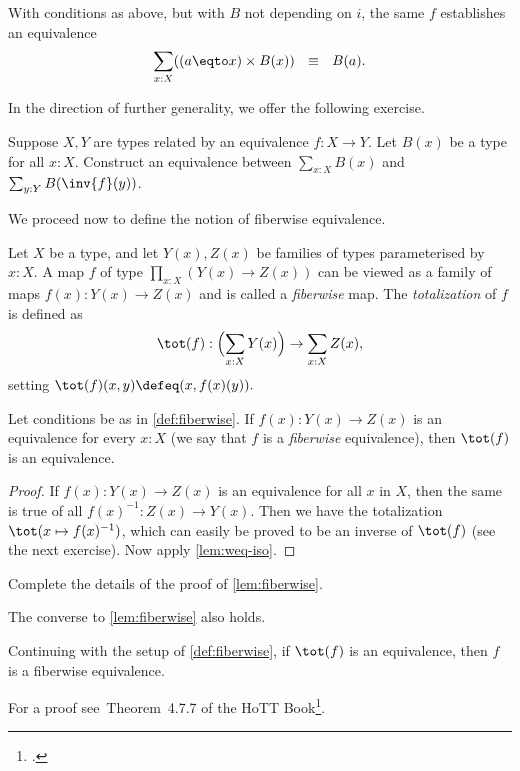 \begin{corollary}\label{cor:contract-away}
With conditions as above, but with $B$ not depending on $i$, the same $f$
establishes an equivalence
\[
 \sum_{x:X} ((a \eqto x)\times B(x))~~\equiv~~B(a).
\]
\end{corollary}

In the direction of further generality, we offer the following exercise.
\begin{xca}\label{xca:sum-equiv-base}
  Suppose $X,Y$ are types related by an equivalence $f : X \to Y$.
  Let $B(x)$ be a type for all $x:X$. Construct an equivalence between
  $\sum_{x:X}B(x)$ and $\sum_{y:Y}B(\inv{f}(y))$.
\end{xca}
We proceed now to define the notion of fiberwise equivalence.

\begin{definition}\label{def:fiberwise}
Let $X$ be a type, and let $Y(x),Z(x)$ be families of types parameterised
by $x:X$. A map $f$ of type $\prod_{x:X}(Y(x)\to Z(x))$
can be viewed as a family of maps $f(x): Y(x)\to Z(x)$ and is called a
\emph{fiberwise} map. The \emph{totalization} of $f$ is defined as
\[
  \tot(f) : \Bigl(\sum_{x:X} Y(x)\Bigr) \to \sum_{x:X} Z(x),
\]
setting $\tot(f)(x,y)\defeq (x,f(x)(y)).$
\end{definition}

\begin{lemma}\label{lem:fiberwise}
Let conditions be as in \cref{def:fiberwise}.
If $f(x): Y(x) \to Z(x)$ is an equivalence for every $x:X$
(we say that $f$ is a \emph{fiberwise} equivalence),
then $\tot(f)$ is an equivalence.
\end{lemma}
\begin{proof}
If $f(x): Y(x) \to Z(x)$ is an equivalence for all $x$ in $X$,
then the same is true of all $f(x)^{-1}: Z(x) \to Y(x)$.
Then we have the totalization $\tot(x\mapsto f(x)^{-1})$,
which can easily be proved to be an inverse of $\tot(f)$
(see the next exercise). Now apply \cref{lem:weq-iso}.
\end{proof}

\begin{xca}\label{xca:fiberwise}
Complete the details of the proof of \cref{lem:fiberwise}.
\end{xca}

The converse to \cref{lem:fiberwise} also holds.
\begin{lemma}\label{lem:fiberwise-equiv-from-tot}
  Continuing with the setup of \cref{def:fiberwise},
  if $\tot(f)$ is an equivalence, then $f$ is a fiberwise equivalence.
\end{lemma}
For a proof see~Theorem~4.7.7 of the HoTT Book\footcite{hottbook}.

